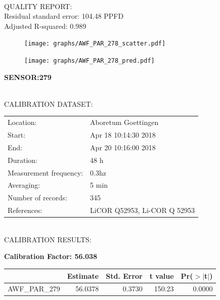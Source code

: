 \documentclass[oneside]{report}
\begin{document}
\hrulefill\\
QUALITY REPORT:\\
Residual standard error: 104.48 PPFD\\
Adjusted R-squared: 0.989



\begin{figure}[H]
  \centering
  \texttt{[image: graphs/AWF\_PAR\_278\_scatter.pdf]}
\end{figure}




\begin{figure}[H]
  \centering
  \texttt{[image: graphs/AWF\_PAR\_278\_pred.pdf]}
\end{figure}

\pagebreak


\begin{center}
\large{\textbf{SENSOR:279}}\\
\end{center}

\hrulefill\\
CALIBRATION DATASET:\\
\begin{table}[h!]
  \centering
  \label{tab:table1}
  \begin{tabular}{ll}
    Location: & Aboretum Goettingen\\ 
    
    
    Start:  & Apr 18 10:14:30 2018 \\
    End:   & Apr 20 10:16:00 2018\\ 
    Duration: & 48 h\\
    Measurement frequency: & 0.3hz\\
    Averaging:  &5 min\\
    Number of records: & 345 \\
    References: & LiCOR Q52953, Li-COR Q 52953 \\
  \end{tabular}
\end{table}

\hrulefill\\
CALIBRATION RESULTS:\\


\begin{center}
\textbf{\large{Calibration Factor: 56.038}}\\
\end{center}
\begin{table}[ht]
\centering
\begin{tabular}{rrrrr}
  \hline
 & Estimate & Std. Error & t value & Pr($>$$|$t$|$) \\ 
  \hline
AWF\_PAR\_279 & 56.0378 & 0.3730 & 150.23 & 0.0000 \\ 
   \hline
\end{tabular}
\end{table}
\end{document}
